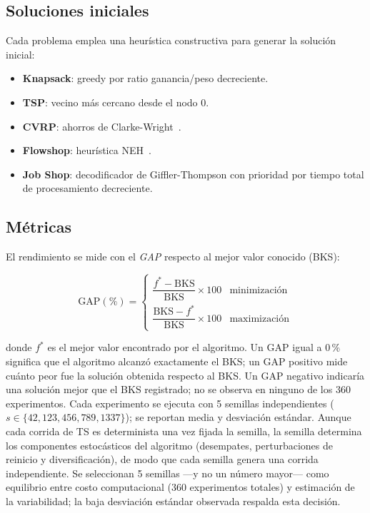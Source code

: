 \subsection{Soluciones iniciales}

Cada problema emplea una heurística constructiva para generar la solución
inicial:

\begin{itemize}
  \item \textbf{Knapsack}: greedy por ratio ganancia/peso decreciente.
  \item \textbf{TSP}: vecino más cercano desde el nodo 0.
  \item \textbf{CVRP}: ahorros de Clarke-Wright~\cite{clarke1964scheduling}.
  \item \textbf{Flowshop}: heurística NEH~\cite{nawaz1983heuristic}.
  \item \textbf{Job Shop}: decodificador de Giffler-Thompson con prioridad
    por tiempo total de procesamiento decreciente.
\end{itemize}

\subsection{Métricas}

El rendimiento se mide con el \emph{GAP} respecto al mejor valor conocido
(BKS):

\begin{equation}
  \text{GAP}(\%) =
  \begin{cases}
    \dfrac{f^* - \text{BKS}}{\text{BKS}} \times 100
      & \text{minimización} \\[6pt]
    \dfrac{\text{BKS} - f^*}{\text{BKS}} \times 100
      & \text{maximización}
  \end{cases}
  \label{eq:gap}
\end{equation}

donde $f^*$ es el mejor valor encontrado por el algoritmo.
Un GAP igual a 0\,\% significa que el algoritmo alcanzó exactamente el BKS;
un GAP positivo mide cuánto peor fue la solución obtenida respecto al BKS.
Un GAP negativo indicaría una solución mejor que el BKS registrado; no se
observa en ninguno de los 360 experimentos.
Cada experimento se ejecuta con 5 semillas independientes
($s \in \{42, 123, 456, 789, 1337\}$); se reportan media y desviación
estándar.
Aunque cada corrida de TS es determinista una vez fijada la semilla, la
semilla determina los componentes estocásticos del algoritmo (desempates,
perturbaciones de reinicio y diversificación), de modo que cada semilla
genera una corrida independiente.
Se seleccionan 5 semillas —y no un número mayor— como equilibrio entre costo
computacional (360 experimentos totales) y estimación de la variabilidad;
la baja desviación estándar observada respalda esta decisión.
